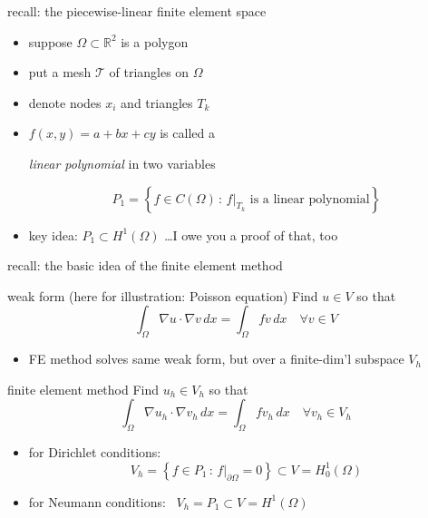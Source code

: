 \documentclass[10pt,
               svgnames,
               hyperref={colorlinks,
                         citecolor=DeepPink4,
                         linkcolor=FireBrick,
                         urlcolor=blue},
               usepdftitle=false]{beamer}
\newcommand{\RR}{\mathbb{R}}
\newcommand{\grad}{\nabla}
\begin{document}
\begin{frame}{recall: the piecewise-linear finite element space}

\begin{itemize}
\item suppose $\Omega \subset \RR^2$ is a polygon
\item put a mesh $\mathcal{T}$ of triangles on $\Omega$
\item denote nodes $x_i$ and triangles $T_k$
\item $f(x,y)=a + bx + cy$ is called a

\emph{linear polynomial} in two variables

\vspace{-25mm}

\hfill 

\medskip

\begin{definition}
    $$P_1 = \left\{f \in C(\Omega)\,:\,f\big|_{T_k} \text{ is a linear polynomial}\right\}$$
\end{definition}

\medskip
\item key idea: \alert{$P_1 \subset H^1(\Omega)$} \quad \dots I owe you a proof of that, too
\end{itemize}
\end{frame}


\begin{frame}{recall: the basic idea of the finite element method}

\begin{block}{weak form (here for illustration: Poisson equation)}
Find $u\in V$ so that
    $$\int_\Omega \grad u \cdot \grad v\,dx = \int_\Omega f v\,dx \quad \forall v\in V$$
\end{block}

\begin{itemize}
\item FE method solves \alert{same weak form}, but over a finite-dim'l subspace $V_h$
\end{itemize}

\begin{block}{finite element method}
Find $u_h\in V_h$ so that
    $$\int_\Omega \grad u_h \cdot \grad v_h\,dx = \int_\Omega f v_h\,dx \quad \forall v_h\in V_h$$
\end{block}

\begin{itemize}
\item for Dirichlet conditions:
   $$V_h = \left\{f \in P_1\,:\,f\big|_{\partial\Omega} = 0\right\} \subset V=H_0^1(\Omega)$$
\item for Neumann conditions: \, $V_h = P_1 \subset V=H^1(\Omega)$
\end{itemize}
\end{frame}
\end{document}
